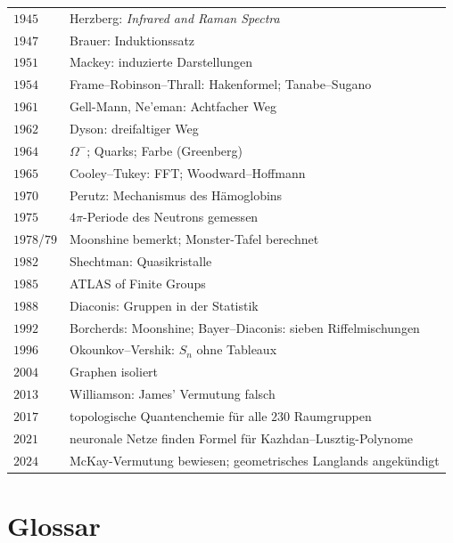 \begin{merksatz}
\begin{center}
{\begin{tabular}{@{}P{1.2cm}P{7.4cm}@{}}
\bottomrule
\end{tabular}}
\end{center}
\begin{center}
{\small
\renewcommand{\arraystretch}{1.42}
\begin{tabular}{@{}P{1.2cm}P{7.4cm}@{}}
\toprule
$1945$ & Herzberg: \textit{Infrared and Raman Spectra}\\
$1947$ & Brauer: Induktionssatz\\
$1951$ & Mackey: induzierte Darstellungen\\
$1954$ & Frame--Robinson--Thrall: Hakenformel; Tanabe--Sugano\\
$1961$ & Gell-Mann, Ne'eman: Achtfacher Weg\\
$1962$ & Dyson: dreifaltiger Weg\\
$1964$ & $\Omega^{-}$; Quarks; Farbe (Greenberg)\\
$1965$ & Cooley--Tukey: FFT; Woodward--Hoffmann\\
$1970$ & Perutz: Mechanismus des Hämoglobins\\
$1975$ & $4\pi$-Periode des Neutrons gemessen\\
$1978$/$79$ & Moonshine bemerkt; Monster-Tafel berechnet\\
$1982$ & Shechtman: Quasikristalle\\
$1985$ & ATLAS of Finite Groups\\
$1988$ & Diaconis: Gruppen in der Statistik\\
$1992$ & Borcherds: Moonshine; Bayer--Diaconis: sieben Riffelmischungen\\
$1996$ & Okounkov--Vershik: $S_n$ ohne Tableaux\\
$2004$ & Graphen isoliert\\
$2013$ & Williamson: James' Vermutung falsch\\
$2017$ & topologische Quantenchemie für alle $230$ Raumgruppen\\
$2021$ & neuronale Netze finden Formel für Kazhdan--Lusztig-Polynome\\
$2024$ & McKay-Vermutung bewiesen; geometrisches Langlands angekündigt\\
\bottomrule
\end{tabular}}
\end{center}
\end{merksatz}

\section{Glossar}

